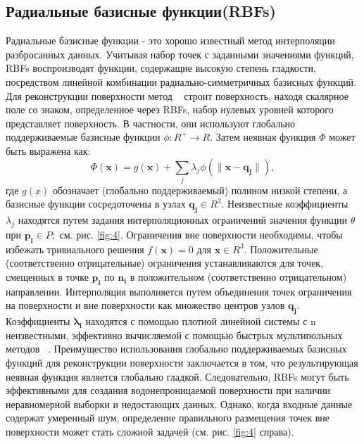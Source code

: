 \subsection{Радиальные базисные функции(RBFs)}
Радиальные базисные функции - это хорошо известный метод интерполяции разбросанных данных. Учитывая набор точек с заданными значениями функций, RBFs воспроизводят функции, содержащие высокую степень гладкости, посредством линейной комбинации радиально-симметричных базисных функций. Для реконструкции поверхности метод ~\cite{CARR} строит поверхность, находя скалярное поле со знаком, определенное через RBFs, набор нулевых уровней которого представляет поверхность. В частности, они используют глобально поддерживаемые базисные функции $\phi : R^{+} \rightarrow R$. Затем неявная функция $\Phi$ может быть выражена как:
$$\Phi(\mathbf{x}) = g(\mathbf{x}) + \sum_j\lambda_j\phi(\parallel \mathbf{x} - \mathbf{q_j} \parallel), $$
где $g(x)$ обозначает (глобально поддерживаемый) полином низкой степени, а базисные функции сосредоточены в узлах $\mathbf{q_j} \in R^{3} $. Неизвестные коэффициенты ${\lambda}_j$ находятся путем задания интерполяционных ограничений значения функции $\theta$ при $\mathbf{p_i} \in P;$ см. рис. \ref{fig:4}. Ограничения вне поверхности необходимы, чтобы избежать тривиального решения $f (\mathbf{x}) = 0$ для $\mathbf{x} \in R^{3}$. Положительные (соответственно отрицательные) ограничения устанавливаются для точек, смещенных в точке $\mathbf{p_i}$ по $\mathbf{n_i}$ в положительном (соответственно отрицательном) направлении. Интерполяция выполняется путем объединения точек ограничения на поверхности и вне поверхности как множество центров узлов $\mathbf{q_{j}} $. Коэффициенты $\mathbf{{\lambda}_i}$ находятся с помощью плотной линейной системы с n неизвестными, эффективно вычисляемой с помощью быстрых мультипольных методов ~\cite{CARR}. Преимущество использования глобально поддерживаемых базисных функций для реконструкции поверхности заключается в том, что результирующая неявная функция является глобально гладкой. Следовательно, RBFs могут быть эффективными для создания водонепроницаемой поверхности при наличии неравномерной выборки и недостающих данных. Однако, когда входные данные содержат умеренный шум, определение правильного размещения точек вне поверхности может стать сложной задачей (см. рис. \ref{fig:4} справа). 

